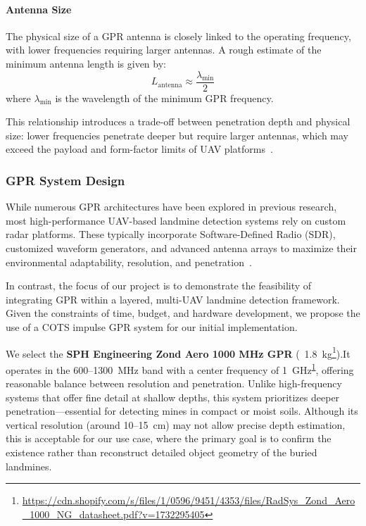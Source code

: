 \paragraph{Antenna Size}

The physical size of a GPR antenna is closely linked to the operating frequency, with lower frequencies requiring larger antennas. A rough estimate of the minimum antenna length is given by:
\[
L_{\text{antenna}} \approx \frac{\lambda_{\text{min}}}{2}
\]
where  $\lambda_{\text{min}}$ is the wavelength of the minimum GPR frequency.

This relationship introduces a trade-off between penetration depth and physical size: lower frequencies penetrate deeper but require larger antennas, which may exceed the payload and form-factor limits of UAV platforms~\cite{alqudsi2021review}.

\subsubsection{GPR System Design}

While numerous GPR architectures have been explored in previous research, most high-performance UAV-based landmine detection systems rely on custom radar platforms. These typically incorporate Software-Defined Radio (SDR), customized waveform generators, and advanced antenna arrays to maximize their environmental adaptability, resolution, and penetration~\cite{cerquera2017uav}.

In contrast, the focus of our project is to demonstrate the feasibility of integrating GPR within a layered, multi-UAV landmine detection framework. Given the constraints of time, budget, and hardware development, we propose the use of a COTS impulse GPR system for our initial implementation.

We select the \textbf{SPH Engineering Zond Aero 1000 MHz GPR} (~1.8~kg\footnote{\label{Zond}\url{https://cdn.shopify.com/s/files/1/0596/9451/4353/files/RadSys_Zond_Aero_1000_NG_datasheet.pdf?v=1732295405}}).It operates in the 600–1300~MHz band with a center frequency of 1~GHz\textsuperscript{\ref{Zond}}, offering reasonable balance between resolution and penetration. Unlike high-frequency systems that offer fine detail at shallow depths, this system prioritizes deeper penetration—essential for detecting mines in compact or moist soils. Although its vertical resolution (around 10--15~cm) may not allow precise depth estimation, this is acceptable for our use case, where the primary goal is to confirm the existence rather than reconstruct detailed object geometry of the buried landmines.

